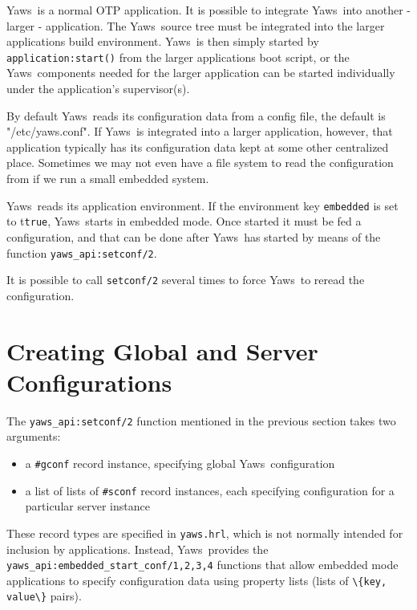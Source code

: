 \documentclass[11pt,oneside,english]{book}
\newcommand{\Yaws}            %
        {{\sc Yaws}}
\begin{document}
\Yaws\  is a normal OTP application. It is possible to integrate \Yaws\
into another - larger - application. The \Yaws\  source tree must be
integrated into the larger applications build environment. \Yaws\  is
then simply started by \verb+application:start()+ from the larger
applications boot script, or the \Yaws\  components needed for the
larger application can be started individually under the application's
supervisor(s).

By default \Yaws\ reads its configuration data from a config file, the
default is "/etc/yaws.conf". If \Yaws\ is integrated into a larger
application, however, that application typically has its configuration
data kept at some other centralized place. Sometimes we may not even
have a file system to read the configuration from if we run a small
embedded system.

\Yaws\  reads its application environment. If the environment key
\verb+embedded+ is set to t\verb+true+, \Yaws\  starts in embedded mode.
Once started it must be fed a configuration, and that can be done
after \Yaws\  has started by means of the function
\verb+yaws_api:setconf/2+.

It is possible to call \verb+setconf/2+ several times to force \Yaws\  to
reread the configuration.

\section{Creating Global and Server Configurations}

The \verb+yaws_api:setconf/2+ function mentioned in the previous
section takes two arguments:

\begin{itemize}

\item a \verb+#gconf+ record instance, specifying global
  \Yaws\  configuration

\item a list of lists of \verb+#sconf+ record instances, each
  specifying configuration for a particular server instance

\end{itemize}

These record types are specified in \verb+yaws.hrl+, which is not
normally intended for inclusion by applications. Instead,
\Yaws\  provides the \verb+yaws_api:embedded_start_conf/1,2,3,4+
functions that allow embedded mode applications to specify
configuration data using property lists (lists of
\verb+\{key, value\}+ pairs).
\end{document}
